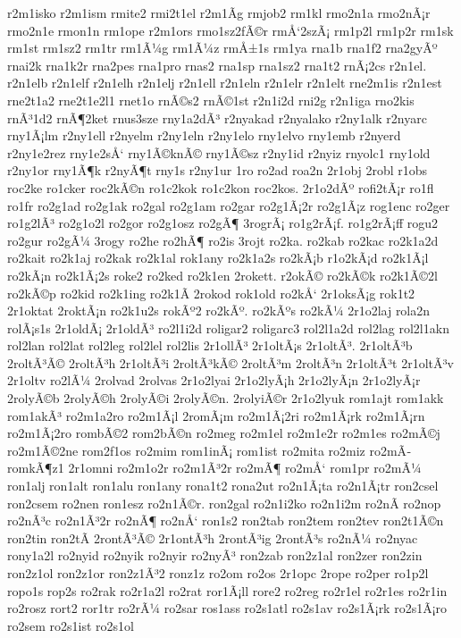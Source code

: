 {r2m1isko
r2m1ism
rmite2
rmi2t1el
r2m1Ã­g
rmjob2
rm1kl
rmo2n1a
rmo2nÃ¡r
rmo2n1e
rmon1n
rm1ope
r2m1ors
rmo1sz2fÃ©r
rmÅ‘2szÃ¡
rm1p2l
rm1p2r
rm1sk
rm1st
rm1sz2
rm1tr
rm1Ã¼g
rm1Ã¼z
rmÅ±1s
rm1ya
rna1b
rna1f2
rna2gyÃº
rnai2k
rna1k2r
rna2pes
rna1pro
rnas2
rna1sp
rna1sz2
rna1t2
rnÃ¡2cs
r2n1el.
r2n1elb
r2n1elf
r2n1elh
r2n1elj
r2n1ell
r2n1eln
r2n1elr
r2n1elt
rne2m1is
r2n1est
rne2t1a2
rne2t1e2l1
rnet1o
rnÃ©s2
rnÃ©1st
r2n1i2d
rni2g
r2n1iga
rno2kis
rnÃ³1d2
rnÃ¶2ket
rnus3sze
rny1a2dÃ³
r2nyakad
r2nyalako
r2ny1alk
r2nyarc
rny1Ã¡lm
r2ny1ell
r2nyelm
r2ny1eln
r2ny1elo
rny1elvo
rny1emb
r2nyerd
r2ny1e2rez
rny1e2sÅ‘
rny1Ã©knÃ©
rny1Ã©sz
r2ny1id
r2nyiz
rnyolc1
rny1old
r2ny1or
rny1Ã¶k
r2nyÃ¶t
rny1s
r2ny1ur
1ro
ro2ad
roa2n
2r1obj
2robl
r1obs
roc2ke
ro1cker
roc2kÃ©n
ro1c2kok
ro1c2kon
roc2kos.
2r1o2dÃº
rofi2tÃ¡r
ro1fl
ro1fr
ro2g1ad
ro2g1ak
ro2gal
ro2g1am
ro2gar
ro2g1Ã¡2r
ro2g1Ã¡z
rog1enc
ro2ger
ro1g2lÃ³
ro2g1o2l
ro2gor
ro2g1osz
ro2gÃ¶
3rogrÃ¡
ro1g2rÃ¡f.
ro1g2rÃ¡ff
rogu2
ro2gur
ro2gÃ¼
3rogy
ro2he
ro2hÃ¶
ro2is
3rojt
ro2ka.
ro2kab
ro2kac
ro2k1a2d
ro2kait
ro2k1aj
ro2kak
ro2k1al
rok1any
ro2k1a2s
ro2kÃ¡b
r1o2kÃ¡d
ro2k1Ã¡l
ro2kÃ¡n
ro2k1Ã¡2s
roke2
ro2ked
ro2k1en
2rokett.
r2okÃ©
ro2kÃ©k
ro2k1Ã©2l
ro2kÃ©p
ro2kid
ro2k1ing
ro2k1Ã­
2rokod
rok1old
ro2kÅ‘
2r1oksÃ¡g
rok1t2
2r1oktat
2roktÃ¡n
ro2k1u2s
rokÃº2
ro2kÃº.
ro2kÃºs
ro2kÃ¼
2r1o2laj
rola2n
rolÃ¡s1s
2r1oldÃ¡
2r1oldÃ³
ro2l1i2d
roligar2
roligarc3
rol2l1a2d
rol2lag
rol2l1akn
rol2lan
rol2lat
rol2leg
rol2lel
rol2lis
2r1ollÃ³
2r1oltÃ¡s
2r1oltÃ³.
2r1oltÃ³b
2roltÃ³Ã©
2roltÃ³h
2r1oltÃ³i
2roltÃ³kÃ©
2roltÃ³m
2roltÃ³n
2r1oltÃ³t
2r1oltÃ³v
2r1oltv
ro2lÃ¼
2rolvad
2rolvas
2r1o2lyai
2r1o2lyÃ¡h
2r1o2lyÃ¡n
2r1o2lyÃ¡r
2rolyÃ©b
2rolyÃ©h
2rolyÃ©i
2rolyÃ©n.
2rolyiÃ©r
2r1o2lyuk
rom1ajt
rom1akk
rom1akÃ³
ro2m1a2ro
ro2m1Ã¡l
2romÃ¡m
ro2m1Ã¡2ri
ro2m1Ã¡rk
ro2m1Ã¡rn
ro2m1Ã¡2ro
rombÃ©2
rom2bÃ©n
ro2meg
ro2m1el
ro2m1e2r
ro2m1es
ro2mÃ©j
ro2m1Ã©2ne
rom2f1os
ro2mim
rom1inÃ¡
rom1ist
ro2mita
ro2miz
ro2mÃ­
romkÃ¶z1
2r1omni
ro2m1o2r
ro2m1Ã³2r
ro2mÃ¶
ro2mÅ‘
rom1pr
ro2mÃ¼
ron1alj
ron1alt
ron1alu
ron1any
rona1t2
rona2ut
ro2n1Ã¡ta
ro2n1Ã¡tr
ron2csel
ron2csem
ro2nen
ron1esz
ro2n1Ã©r.
ron2gal
ro2n1i2ko
ro2n1i2m
ro2nÃ­
ro2nop
ro2nÃ³c
ro2n1Ã³2r
ro2nÃ¶
ro2nÅ‘
ron1s2
ron2tab
ron2tem
ron2tev
ron2t1Ã©n
ron2tin
ron2tÃ­
2rontÃ³Ã©
2r1ontÃ³h
2rontÃ³ig
2rontÃ³s
ro2nÃ¼
ro2nyac
rony1a2l
ro2nyid
ro2nyik
ro2nyir
ro2nyÃ³
ron2zab
ron2z1al
ron2zer
ron2zin
ron2z1ol
ron2z1or
ron2z1Ã³2
ronz1z
ro2om
ro2os
2r1opc
2rope
ro2per
ro1p2l
ropo1s
rop2s
ro2rak
ro2r1a2l
ro2rat
ror1Ã¡ll
rore2
ro2reg
ro2r1el
ro2r1es
ro2r1in
ro2rosz
rort2
ror1tr
ro2rÃ¼
ro2sar
ros1ass
ro2s1atl
ro2s1av
ro2s1Ã¡rk
ro2s1Ã¡ro
ro2sem
ro2s1ist
ro2s1ol
}
